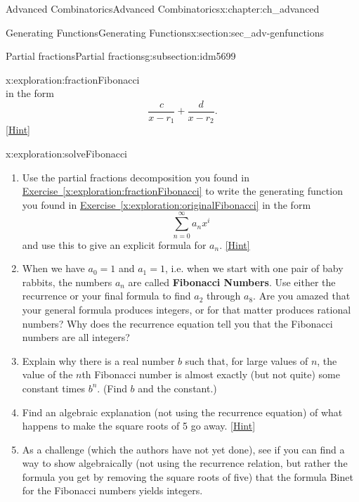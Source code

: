 \documentclass[oneside,10pt,]{book}
\newcommand{\terminology}[1]{\textbf{#1}}
\numberwithin{equation}{chapter}
\begin{document}
\begin{chapterptx}{Advanced Combinatorics}{}{Advanced Combinatorics}{}{}{x:chapter:ch_advanced}
\begin{sectionptx}{Generating Functions}{}{Generating Functions}{}{}{x:section:sec_adv-genfunctions}
\begin{subsectionptx}{Partial fractions}{}{Partial fractions}{}{}{g:subsection:idm5699}
\begin{exploration}{}{x:exploration:fractionFibonacci}
\begin{equation*}
\end{equation*}
in the form%
\begin{equation*}
\frac{c}{x-r_1} + \frac{d}{x-r_2}.
\end{equation*}
%
\space\hspace*{0pt}\hfill{\tiny\hyperlink{g:hint:idm5855-back}{[Hint]}}\end{exploration}
%
\begin{exploration}{}{x:exploration:solveFibonacci}%
\begin{enumerate}[font=\bfseries,label=(\alph*),ref=\alph*]
\item{}Use the partial fractions decomposition you found in \hyperref[x:exploration:fractionFibonacci]{Exercise~\ref{x:exploration:fractionFibonacci}} to write the generating function you found in \hyperref[x:exploration:originalFibonacci]{Exercise~\ref{x:exploration:originalFibonacci}} in the form%
\begin{equation*}
\sum_{n=0}^\infty a_nx^i
\end{equation*}
and use this to give an explicit formula for \(a_n\).%
\space\hspace*{0pt}\hfill{\tiny\hyperlink{g:hint:idm5881-back}{[Hint]}}\item{}When we have \(a_0=1\) and \(a_1=1\), i.e. when we start with one pair of baby rabbits, the numbers \(a_n\) are called \terminology{Fibonacci Numbers}.  Use either the recurrence or your final formula to find \(a_2\) through \(a_8\).  Are you amazed that your general formula produces integers, or for that matter produces rational numbers?  Why does the recurrence equation tell you that the Fibonacci numbers are all integers?%
\item{}Explain why there is a real number \(b\) such that, for large values of \(n\), the value of the \(n\)th Fibonacci number is almost exactly (but not quite) some constant times \(b^n\). (Find \(b\) and the constant.)%
\item{}Find an algebraic explanation (not using the recurrence equation) of what happens to make the square roots of 5 go away.%
\space\hspace*{0pt}\hfill{\tiny\hyperlink{g:hint:idm5940-back}{[Hint]}}\item{}As a challenge (which the authors have not yet done), see if you can find a way to show algebraically (not using the recurrence relation, but rather the formula you get by removing the square roots of five) that the formula Binet for the Fibonacci numbers yields integers.%

\end{enumerate}
\end{exploration}
\end{subsectionptx}
\end{sectionptx}
\end{chapterptx}
\end{document}
